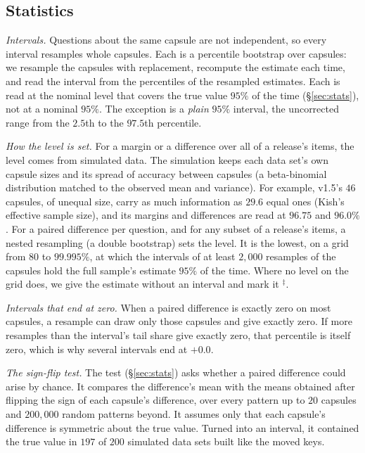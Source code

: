 \documentclass{article}
\begin{document}
\subsection{Statistics}
\label{app:stats}

\emph{Intervals.} Questions about the same capsule are not independent, so every interval resamples whole capsules.
Each is a percentile bootstrap over capsules: we resample the capsules with replacement, recompute the estimate each
time, and read the interval from the percentiles of the resampled estimates. Each is read at the nominal level that
covers the true value $95\%$ of the time (\S\ref{sec:stats}), not at a nominal $95\%$. The exception is a
\emph{plain} $95\%$ interval, the uncorrected range from the $2.5$th to the $97.5$th percentile.

\emph{How the level is set.} For a margin or a difference over all of a release's items, the level comes from
simulated data. The simulation keeps each data set's own capsule sizes and its spread of accuracy between capsules
(a beta-binomial distribution matched to the observed mean and variance). For example, v1.5's $46$ capsules, of
unequal size, carry as much information as $29.6$ equal ones (Kish's effective sample size), and its margins and differences are read at
$96.75$ and $96.0\%$. For a paired difference per question, and for any subset of a release's items, a nested
resampling (a double bootstrap) sets the level. It is the lowest, on a grid from $80$ to $99.995\%$, at which the
intervals of at least $2{,}000$ resamples of the capsules hold the full sample's estimate $95\%$ of the time. Where no
level on the grid does, we give the estimate without an interval and mark it $^{\ddagger}$.

\emph{Intervals that end at zero.} When a paired difference is exactly zero on most capsules, a resample can draw
only those capsules and give exactly zero. If more resamples than the interval's tail share give exactly zero, that
percentile is itself zero, which is why several intervals end at $+0.0$.

\emph{The sign-flip test.} The test (\S\ref{sec:stats}) asks whether a paired difference could arise by chance. It
compares the difference's mean with the means obtained after flipping the sign of each capsule's difference, over
every pattern up to $20$ capsules and $200{,}000$ random patterns beyond. It assumes only that each capsule's
difference is symmetric about the true value. Turned into an interval, it contained the true value in $197$ of $200$
simulated data sets built like the moved keys.
\end{document}
